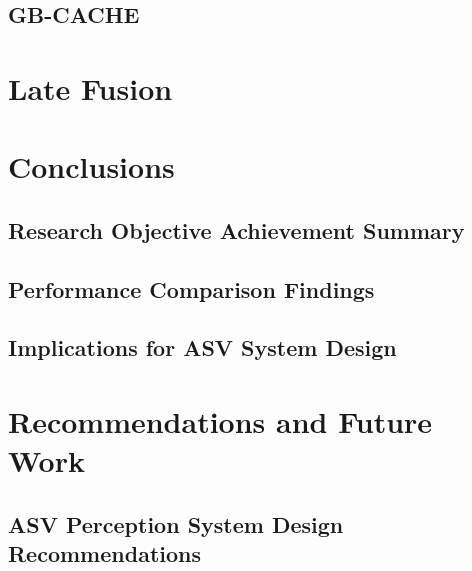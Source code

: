 \documentclass{erauthesis}
\begin{document}
    \section{GB-CACHE} \label{gbcache}

\chapter{Late Fusion}

\chapter{Conclusions}


\section{Research Objective Achievement Summary}

\section{Performance Comparison Findings}

\section{Implications for ASV System Design}

\chapter{Recommendations and Future Work}


\section{ASV Perception System Design Recommendations}
\end{document}
